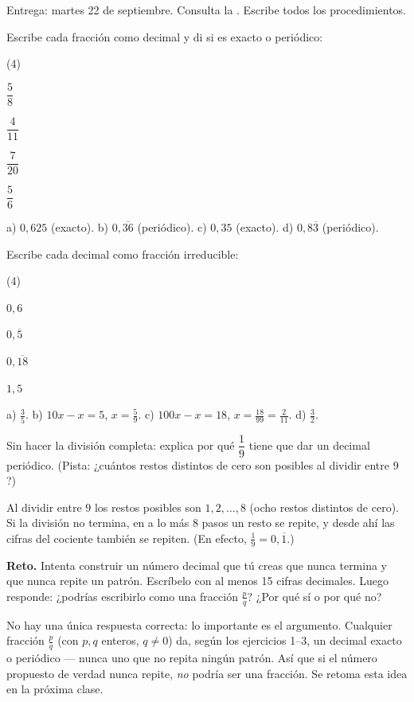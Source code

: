 \documentclass[11pt]{article}
\begin{document}
\encabezado

\begin{instrucciones}
Entrega: martes 22 de septiembre. Consulta la .
Escribe todos los procedimientos.
\end{instrucciones}

\begin{preguntas}

\pregunta Escribe cada fracción como decimal y di si es exacto o periódico:
\begin{opciones*}(4)
  \item $\dfrac{5}{8}$
  \item $\dfrac{4}{11}$
  \item $\dfrac{7}{20}$
  \item $\dfrac{5}{6}$
\end{opciones*}
\begin{solucion}[3cm]
a) $0{,}625$ (exacto). b) $0{,}\overline{36}$ (periódico). c) $0{,}35$ (exacto).
d) $0{,}8\overline{3}$ (periódico).
\end{solucion}

\pregunta Escribe cada decimal como fracción irreducible:
\begin{opciones*}(4)
  \item $0{,}6$
  \item $0{,}\overline{5}$
  \item $0{,}\overline{18}$
  \item $1{,}5$
\end{opciones*}
\begin{solucion}[4cm]
a) $\frac{3}{5}$. b) $10x - x = 5$, $x = \frac{5}{9}$. c) $100x - x = 18$,
$x = \frac{18}{99} = \frac{2}{11}$. d) $\frac{3}{2}$.
\end{solucion}

\pregunta Sin hacer la división completa: explica por qué $\dfrac{1}{9}$ tiene que dar un
decimal periódico. (Pista: ¿cuántos restos distintos de cero son posibles al dividir entre
$9$?)
\begin{solucion}
Al dividir entre $9$ los restos posibles son $1, 2, \ldots, 8$ (ocho restos distintos de
cero). Si la división no termina, en a lo más $8$ pasos un resto se repite, y desde ahí las
cifras del cociente también se repiten. (En efecto, $\frac{1}{9} = 0{,}\overline{1}$.)
\end{solucion}

\pregunta \textbf{Reto.} Intenta construir un número decimal que tú creas que nunca termina
y que nunca repite un patrón. Escríbelo con al menos 15 cifras decimales. Luego responde:
¿podrías escribirlo como una fracción $\frac{p}{q}$? ¿Por qué sí o por qué no?
\begin{solucion}
No hay una única respuesta correcta: lo importante es el argumento. Cualquier fracción
$\frac{p}{q}$ (con $p,q$ enteros, $q\neq 0$) da, según los ejercicios 1–3, un decimal exacto
o periódico — nunca uno que no repita ningún patrón. Así que si el número propuesto de
verdad nunca repite, \emph{no} podría ser una fracción. Se retoma esta idea en la próxima
clase.
\end{solucion}

\end{preguntas}
\end{document}

